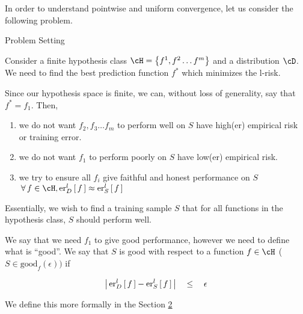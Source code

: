 \documentclass[11pt,a4paper]{article}
\begin{document}
\makeheader%

In order to understand pointwise and uniform convergence, let us consider the following problem.

\begin{ssection}[1]{Problem Setting}

	Consider a finite hypothesis class $\cH = \set{f^1, f^2 \dots f^m}$ and a distribution $\cD$. We need to find the best prediction function $f^\ast$ which minimizes the l-risk.

	Since our hypothesis space is finite, we can, without loss of generality, say that $f^\ast = f_1$. Then,
	\begin{enumerate}
		\item we do not want $f_2, f_3 \dots f_m$ to perform well on $S$ \ie have high(er) empirical risk or training error.
		\item we do not want $f_1$ to perform poorly on $S$ \ie have low(er) empirical risk.
		\item we try to ensure all $f_i$ give faithful and honest performance on $S$ \ie $\qforall f \in \cH, \err[_D^l]{f} \approx \err[_S^l]{f}$
	\end{enumerate}

	Essentially, we wish to find a training sample $S$ that for all functions in the hypothesis class, $S$ should perform well.

	We say that we need $f_1$ to give good performance, however we need to define what is ``good''. We say that $S$ is good with respect to a function $f \in \cH$ ($S \in \text{good}_f(\epsilon))$ if

	\begin{align*}
		\abs{\err[_D^l]{f} - \err[_S^l]{f}}	\qle	\epsilon
	\end{align*} \sbr

	We define this more formally in the Section \hyperlink{sec:2}{2}


\end{ssection}
\end{document}
